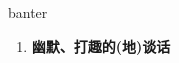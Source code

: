 
\begin{frame}
{\huge banter}
\begin{center}
\begin{enumerate}\Large
  \item \textbf{幽默、打趣的(地)谈话}
\end{enumerate}
\end{center}
\end{frame}
